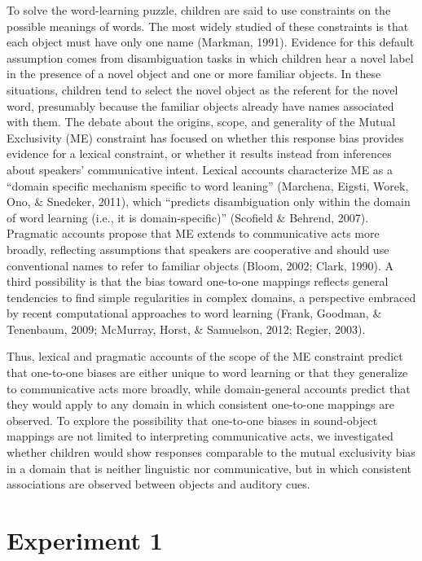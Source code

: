 \documentclass[english,floatsintext,man]{apa6}
\theoremstyle{definition}
\theoremstyle{definition}
\theoremstyle{definition}
\theoremstyle{remark}
\begin{document}
To solve the word-learning puzzle, children are said to use constraints
on the possible meanings of words. The most widely studied of these
constraints is that each object must have only one name (Markman, 1991).
Evidence for this default assumption comes from disambiguation tasks in
which children hear a novel label in the presence of a novel object and
one or more familiar objects. In these situations, children tend to
select the novel object as the referent for the novel word, presumably
because the familiar objects already have names associated with them.
The debate about the origins, scope, and generality of the Mutual
Exclusivity (ME) constraint has focused on whether this response bias
provides evidence for a lexical constraint, or whether it results
instead from inferences about speakers' communicative intent. Lexical
accounts characterize ME as a \enquote{domain specific mechanism
specific to word leaning} (Marchena, Eigsti, Worek, Ono, \& Snedeker,
2011), which \enquote{predicts disambiguation only within the domain of
word learning (i.e., it is domain-specific)} (Scofield \& Behrend,
2007). Pragmatic accounts propose that ME extends to communicative acts
more broadly, reflecting assumptions that speakers are cooperative and
should use conventional names to refer to familiar objects (Bloom, 2002;
Clark, 1990). A third possibility is that the bias toward one-to-one
mappings reflects general tendencies to find simple regularities in
complex domains, a perspective embraced by recent computational
approaches to word learning (Frank, Goodman, \& Tenenbaum, 2009;
McMurray, Horst, \& Samuelson, 2012; Regier, 2003).

Thus, lexical and pragmatic accounts of the scope of the ME constraint
predict that one-to-one biases are either unique to word learning or
that they generalize to communicative acts more broadly, while
domain-general accounts predict that they would apply to any domain in
which consistent one-to-one mappings are observed. To explore the
possibility that one-to-one biases in sound-object mappings are not
limited to interpreting communicative acts, we investigated whether
children would show responses comparable to the mutual exclusivity bias
in a domain that is neither linguistic nor communicative, but in which
consistent associations are observed between objects and auditory cues.

\hypertarget{experiment-1}{%
\section{Experiment 1}\label{experiment-1}}
\end{document}
